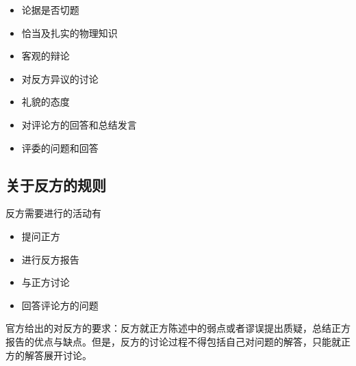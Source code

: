 \documentclass[a4paper,10pt,english]{sphinxmanual}
\begin{document}
\begin{itemize}
\begin{description}
\begin{itemize}
\item {} 
论据是否切题

\item {} 
恰当及扎实的物理知识

\item {} 
客观的辩论

\item {} 
对反方异议的讨论

\item {} 
礼貌的态度

\item {} 
对评论方的回答和总结发言

\item {} 
评委的问题和回答

\end{itemize}

\end{description}

\end{itemize}


\subsection{关于反方的规则}
\label{\detokenize{7. Tournament:id4}}
反方需要进行的活动有
\begin{itemize}
\item {} 
提问正方

\item {} 
进行反方报告

\item {} 
与正方讨论

\item {} 
回答评论方的问题

\end{itemize}

官方给出的对反方的要求：反方就正方陈述中的弱点或者谬误提出质疑，总结正方报告的优点与缺点。但是，反方的讨论过程不得包括自己对问题的解答，只能就正方的解答展开讨论。
\end{document}
